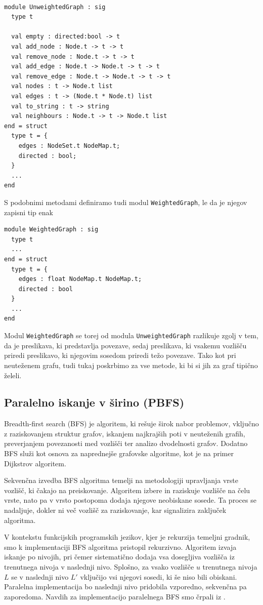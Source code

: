 \documentclass[mat1, tisk]{fmfdelo}
\begin{document}
\begin{lstlisting}

module UnweightedGraph : sig
  type t

  val empty : directed:bool -> t
  val add_node : Node.t -> t -> t
  val remove_node : Node.t -> t -> t
  val add_edge : Node.t -> Node.t -> t -> t
  val remove_edge : Node.t -> Node.t -> t -> t
  val nodes : t -> Node.t list
  val edges : t -> (Node.t * Node.t) list
  val to_string : t -> string
  val neighbours : Node.t -> t -> Node.t list
end = struct
  type t = {
    edges : NodeSet.t NodeMap.t;
    directed : bool;
  }
  ...
end

\end{lstlisting}
S podobnimi metodami definiramo tudi modul \texttt{WeightedGraph}, le da je njegov zapisni tip enak
\begin{lstlisting}
module WeightedGraph : sig
  type t
  ...
end = struct
  type t = {
    edges : float NodeMap.t NodeMap.t; 
    directed : bool
  }
  ...
end
\end{lstlisting}

Modul \texttt{WeightedGraph} se torej od modula \texttt{UnweightedGraph} razlikuje zgolj v tem, da je preslikava, ki
predstavlja povezave, sedaj preslikava, ki vsakemu vozlišču priredi preslikavo, ki njegovim sosedom priredi težo povezave.
Tako kot pri neuteženem grafu, tudi tukaj poskrbimo za vse metode, ki bi si jih za graf tipično želeli.


\subsection{Paralelno iskanje v širino (PBFS)}

Breadth-first search (BFS) je algoritem, ki rešuje širok nabor problemov, vključno z raziskovanjem struktur
grafov, iskanjem najkrajših poti v neuteženih grafih, preverjanjem povezanosti med vozlišči ter analizo dvodelnosti grafov.
Dodatno BFS služi kot osnova za naprednejše grafovske algoritme, kot je na primer Dijkstrov algoritem.

Sekvenčna izvedba BFS algoritma temelji na metodologiji upravljanja vrste vozlišč, ki čakajo na preiskovanje.
Algoritem izbere in raziskuje vozlišče na čelu vrste, nato pa v vrsto postopoma dodaja njegove neobiskane sosede.
Ta proces se nadaljuje, dokler ni več vozlišč za raziskovanje, kar signalizira zaključek algoritma.

V kontekstu funkcijskih programskih jezikov, kjer je rekurzija temeljni gradnik, smo k implementaciji BFS algoritma
pristopil rekurzivno.
Algoritem izvaja iskanje po nivojih, pri čemer sistematično dodaja vsa dosegljiva vozlišča iz trenutnega nivoja v naslednji nivo.
Splošno, za vsako vozlišče $u$ trenutnega nivoja $L$ se v naslednji nivo $L'$ vključijo vsi njegovi sosedi, ki še niso
bili obiskani. Paralelna implementacija bo naslednji nivo pridobila vzporedno, sekvenčna pa zaporedoma.
Navdih za implementacijo paralelnega BFS smo črpali iz \cite{spaa2010}.
\end{document}

